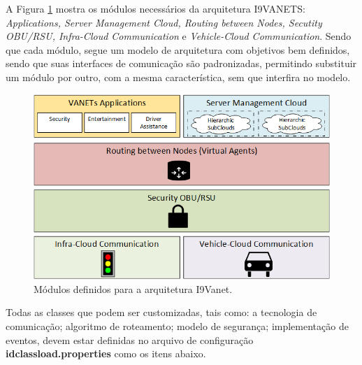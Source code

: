 \documentclass[
	12pt,				%
	oneside,			%
	a4paper,			%
	english,			%
	brazil				%
	]{abntex2ppgsi}
\begin{document}
A Figura \ref{fig:dModulos} mostra os módulos necessários da arquitetura I9VANETS:  \textit{Applications, Server Management Cloud, Routing between Nodes, Secutity OBU/RSU, Infra-Cloud Communication} e \textit{Vehicle-Cloud Communication}. Sendo que cada módulo, segue um modelo de arquitetura com objetivos bem definidos, sendo que suas interfaces de comunicação são padronizadas, permitindo substituir um módulo por outro, com a mesma característica, sem que interfira no modelo.

\begin{figure}[h!]
	\centering
	\includegraphics [width=12cm,height=7cm] {images/modulos.png}
	\caption{Módulos definidos para a arquitetura I9Vanet.}
	\label{fig:dModulos}
\end{figure}

Todas as classes que podem ser customizadas, tais como: a tecnologia de comunicação; algoritmo de roteamento; modelo de segurança; implementação de eventos, devem estar definidas no arquivo de configuração \textbf{idclassload.properties} como os itens abaixo.
\end{document}

